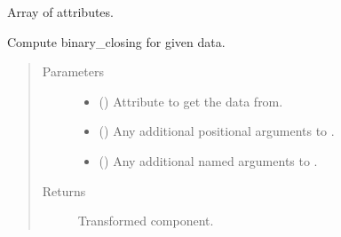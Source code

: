 \documentclass[letterpaper,10pt,english]{sphinxmanual}
\begin{document}
\begin{fulllineitems}
\begin{fulllineitems}
\begin{quote}
\begin{description}
\end{description}\end{quote}

\end{fulllineitems}


\begin{fulllineitems}
\label{\detokenize{api/states:geology.src.States.attributes}}
Array of attributes.

\end{fulllineitems}


\begin{fulllineitems}
\label{\detokenize{api/states:geology.src.States.binary_closing}}
Compute binary\_closing for given data.
\begin{quote}\begin{description}
\item[{Parameters}] \leavevmode\begin{itemize}
\item {} 
 (\sphinxstyleliteralemphasis{\sphinxupquote{, }}) \textendash{} Attribute to get the data from.

\item {} 
 () \textendash{} Any additional positional arguments to .

\item {} 
 () \textendash{} Any additional named arguments to .

\end{itemize}

\item[{Returns}] \leavevmode
{} \textendash{} Transformed component.


\end{description}
\end{quote}
\end{fulllineitems}
\end{fulllineitems}
\end{document}
